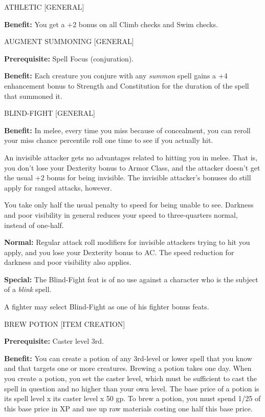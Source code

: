 \documentclass{article}
\begin{document}
\vspace{12pt}
ATHLETIC [GENERAL]

\textbf{Benefit:} You get a +2 bonus on all Climb checks and Swim checks.

\vspace{12pt}
AUGMENT SUMMONING [GENERAL]

\textbf{Prerequisite:} Spell Focus (conjuration).

\textbf{Benefit:} Each creature you conjure with any \textit{summon }spell gains 
a +4 enhancement bonus to Strength and Constitution for the duration of the spell 
that summoned it.

\vspace{12pt}
BLIND-FIGHT [GENERAL]

\textbf{Benefit:} In melee, every time you miss because of concealment, you can 
reroll your miss chance percentile roll one time to see if you actually hit.

An invisible attacker gets no advantages related to hitting you in melee. That 
is, you don't lose your Dexterity bonus to Armor Class, and the attacker doesn't 
get the usual +2 bonus for being invisible. The invisible attacker's bonuses do 
still apply for ranged attacks, however.

You take only half the usual penalty to speed for being unable to see. Darkness 
and poor visibility in general reduces your speed to three-quarters normal, instead 
of one-half.

\textbf{Normal:} Regular attack roll modifiers for invisible attackers trying to 
hit you apply, and you lose your Dexterity bonus to AC. The speed reduction for 
darkness and poor visibility also applies.

\textbf{Special:} The Blind-Fight feat is of no use against a character who is 
the subject of a \textit{blink }spell.

A fighter may select Blind-Fight as one of his fighter bonus feats.

\vspace{12pt}
BREW POTION [ITEM CREATION]

\textbf{Prerequisite:} Caster level 3rd.

\textbf{Benefit:} You can create a potion of any 3rd-level or lower spell that 
you know and that targets one or more creatures. Brewing a potion takes one day. 
When you create a potion, you set the caster level, which must be sufficient to 
cast the spell in question and no higher than your own level. The base price of 
a potion is its spell level x $ $its caster level x $ $50 gp. To brew a potion, 
you must spend 1/25 of this base price in XP and use up raw materials costing one 
half this base price.
\end{document}
